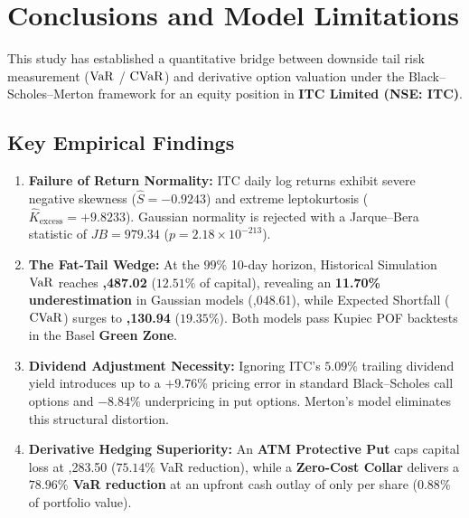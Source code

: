 
\section{Conclusions and Model Limitations}
\label{sec:conclusions}

This study has established a quantitative bridge between downside tail risk measurement ($\operatorname{VaR}$ / $\operatorname{CVaR}$) and derivative option valuation under the Black--Scholes--Merton framework for an equity position in \textbf{ITC Limited (NSE: ITC)}. 

\subsection{Key Empirical Findings}
\begin{enumerate}[leftmargin=1.8em, noitemsep]
    \item \textbf{Failure of Return Normality:} ITC daily log returns exhibit severe negative skewness ($\hat{S} = -0.9243$) and extreme leptokurtosis ($\hat{K}_{\text{excess}} = +9.8233$). Gaussian normality is rejected with a Jarque--Bera statistic of $JB = 979.34$ ($p = 2.18 \times 10^{-213}$).
    \item \textbf{The Fat-Tail Wedge:} At the $99\%$ 10-day horizon, Historical Simulation $\operatorname{VaR}$ reaches \textbf{,487.02} ($12.51\%$ of capital), revealing an \textbf{11.70\% underestimation} in Gaussian models (,048.61), while Expected Shortfall ($\operatorname{CVaR}$) surges to \textbf{,130.94} ($19.35\%$). Both models pass Kupiec POF backtests in the Basel \textbf{Green Zone}.
    \item \textbf{Dividend Adjustment Necessity:} Ignoring ITC's $5.09\%$ trailing dividend yield introduces up to a $+9.76\%$ pricing error in standard Black--Scholes call options and $-8.84\%$ underpricing in put options. Merton's model eliminates this structural distortion.
    \item \textbf{Derivative Hedging Superiority:} An \textbf{ATM Protective Put} caps capital loss at ,283.50 ($75.14\%$ VaR reduction), while a \textbf{Zero-Cost Collar} delivers a \textbf{$78.96\%$ VaR reduction} at an upfront cash outlay of only  per share ($0.88\%$ of portfolio value).
\end{enumerate}

